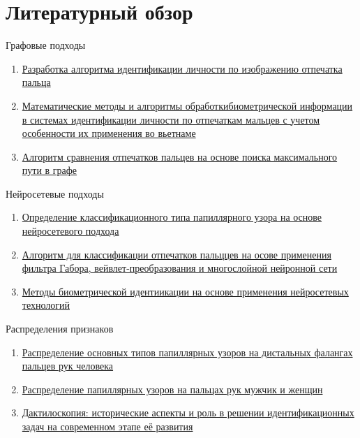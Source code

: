 \documentclass{article}
\begin{document}
\section{Литературный обзор} 
Графовые подходы \\
\begin{enumerate}
     \item \href{https://elibrary.ru/download/elibrary_17421420_21592996.pdf}{Разработка алгоритма идентификации личности по изображению отпечатка пальца}
     \item \href{https://elibrary.ru/download/elibrary_25727935_97678811.pdf}{Математические методы и алгоритмы обработкибиометрической информации в системах идентификации личности по отпечаткам мальцев с учетом особенности их применения во вьетнаме}
     \item \href{https://www.mathnet.ru/php/archive.phtml?wshow=paper&jrnid=ista&paperid=128&option_lang=rus}{Алгоритм сравнения отпечатков пальцев на основе поиска максимального пути в графе}
\end{enumerate}
Нейросетевые подходы \\
\begin{enumerate}
     \item \href{https://cj.bgu.ru/reader/article.aspx?id=27104}{Определение классификационного типа папиллярного узора на основе нейросетевого подхода}
     \item \href{https://cyberleninka.ru/article/n/algoritmy-dlya-klassifikatsii-otpechatkov-paltsev-na-osnove-primeneniya-filtra-gabora-veyvletspreobrazovaniya-i-mnogosloynoy}{Алгоритм для классификации отпечатков пальццев на осове применения фильтра Габора, вейвлет-преобразования и многослойной нейронной сети}
     \item \href{https://elibrary.ru/download/elibrary_42663680_16253640.pdf}{Методы биометрической идентиикации на основе применения нейросетевых технологий}
\end{enumerate}
Распределения признаков \\
\begin{enumerate}
     \item \href{https://www.mediasphera.ru/issues/sudebno-meditsinskaya-ekspertiza/2019/1/1003945212019011017}{Распределение основных типов папиллярных узоров на дистальных фалангах пальцев рук человека}
     \item \href{https://elib.gsmu.by/handle/GomSMU/9062}{Распределение папиллярных узоров на пальцах рук мужчик и женщин}
     \item \href{https://elibrary.ru/download/elibrary_38557701_42204720.pdf}{Дактилоскопия: исторические аспекты и роль в решении идентификационных задач на современном этапе её развития}
     
\end{enumerate}
\end{document}
